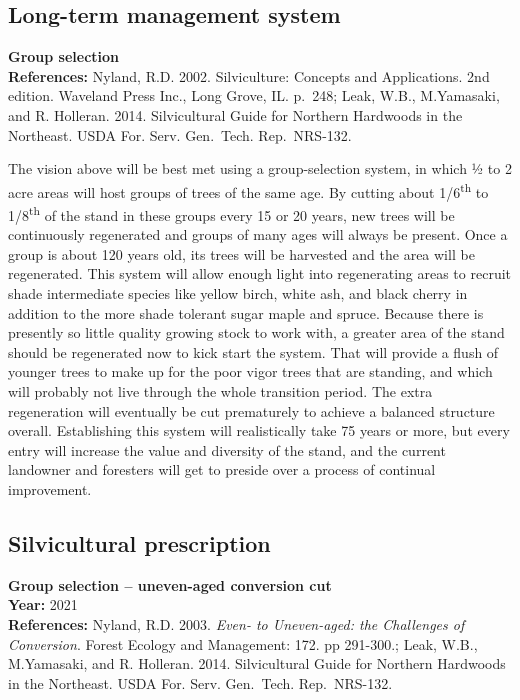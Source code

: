 \documentclass[]{tufte-handout}
\begin{document}
\subsection{Long-term management
system}\label{long-term-management-system-1}

\textbf{Group selection}\\
\textbf{References:} Nyland, R.D. 2002. Silviculture: Concepts and
Applications. 2nd edition. Waveland Press Inc., Long Grove, IL. p.~248;
Leak, W.B., M.Yamasaki, and R. Holleran. 2014. Silvicultural Guide for
Northern Hardwoods in the Northeast. USDA For. Serv. Gen.~Tech.
Rep.~NRS-132.

The vision above will be best met using a group-selection system, in
which ½ to 2 acre areas will host groups of trees of the same age. By
cutting about 1/6\textsuperscript{th} to 1/8\textsuperscript{th} of the
stand in these groups every 15 or 20 years, new trees will be
continuously regenerated and groups of many ages will always be present.
Once a group is about 120 years old, its trees will be harvested and the
area will be regenerated. This system will allow enough light into
regenerating areas to recruit shade intermediate species like yellow
birch, white ash, and black cherry in addition to the more shade
tolerant sugar maple and spruce. Because there is presently so little
quality growing stock to work with, a greater area of the stand should
be regenerated now to kick start the system. That will provide a flush
of younger trees to make up for the poor vigor trees that are standing,
and which will probably not live through the whole transition period.
The extra regeneration will eventually be cut prematurely to achieve a
balanced structure overall. Establishing this system will realistically
take 75 years or more, but every entry will increase the value and
diversity of the stand, and the current landowner and foresters will get
to preside over a process of continual improvement.

\subsection{Silvicultural
prescription}\label{silvicultural-prescription-1}

\textbf{Group selection -- uneven-aged conversion cut}\\
\textbf{Year:} 2021\\
\textbf{References:} Nyland, R.D. 2003. \emph{Even- to Uneven-aged: the
Challenges of Conversion}. Forest Ecology and Management: 172. pp
291-300.; Leak, W.B., M.Yamasaki, and R. Holleran. 2014. Silvicultural
Guide for Northern Hardwoods in the Northeast. USDA For. Serv.
Gen.~Tech. Rep.~NRS-132.
\end{document}
